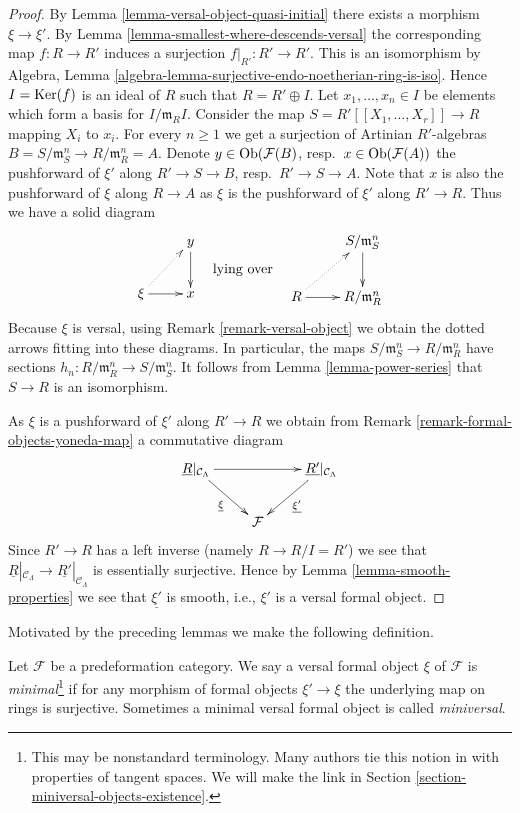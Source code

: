 \begin{proof}
By
Lemma \ref{lemma-versal-object-quasi-initial}
there exists a morphism $\xi \to \xi'$. By
Lemma \ref{lemma-smallest-where-descends-versal}
the corresponding map $f : R \to R'$ induces a surjection
$f|_{R'} : R' \to R'$. This is an isomorphism by
Algebra, Lemma \ref{algebra-lemma-surjective-endo-noetherian-ring-is-iso}.
Hence $I = \mathop{\mathrm{Ker}}(f)$ is an ideal of $R$ such that $R = R' \oplus I$.
Let $x_1, \ldots, x_n \in I$ be elements which form a basis for
$I/\mathfrak m_RI$. Consider the map
$S = R'[[X_1, \ldots, X_r]] \to R$ mapping $X_i$ to $x_i$.
For every $n \geq 1$ we get a surjection of Artinian $R'$-algebras
$B = S/\mathfrak m_S^n \to R/\mathfrak m_R^n = A$. Denote
$y \in \mathop{\mathrm{Ob}}\nolimits(\mathcal{F}(B)$, resp.\ $x \in \mathop{\mathrm{Ob}}\nolimits(\mathcal{F}(A))$
the pushforward of $\xi'$ along $R' \to S \to B$, resp.\ $R' \to S \to A$.
Note that $x$ is also the pushforward of $\xi$ along $R \to A$ as
$\xi$ is the pushforward of $\xi'$ along $R' \to R$.
Thus we have a solid diagram
$$
\vcenter{
\xymatrix{
& y \ar[d] \\
\xi \ar[r] \ar@{..>}[ru] & x
}
}
\quad\text{lying over}\quad
\vcenter{
\xymatrix{
& S/\mathfrak m_S^n \ar[d] \\
R \ar[r] \ar@{..>}[ru] & R/\mathfrak m_R^n
}
}
$$
Because $\xi$ is versal, using
Remark \ref{remark-versal-object}
we obtain the dotted arrows fitting into these diagrams.
In particular, the maps $S/\mathfrak m_S^n \to R/\mathfrak m_R^n$
have sections $h_n : R/\mathfrak m_R^n \to S/\mathfrak m_S^n$.
It follows from
Lemma \ref{lemma-power-series}
that $S \to R$ is an isomorphism.

\medskip\noindent
As $\xi$ is a pushforward of $\xi'$ along $R' \to R$ we obtain from
Remark \ref{remark-formal-objects-yoneda-map}
a commutative diagram
$$
\xymatrix{
\underline{R}|_{\mathcal{C}_\Lambda} \ar[rr] \ar[rd]_{\underline{\xi}} & &
\underline{R'}|_{\mathcal{C}_\Lambda} \ar[ld]^{\underline{\xi'}} \\
& \mathcal{F}
}
$$
Since $R' \to R$ has a left inverse (namely $R \to R/I = R'$) we see that
$\underline{R}|_{\mathcal{C}_\Lambda} \to
\underline{R'}|_{\mathcal{C}_\Lambda}$ is essentially surjective.
Hence by
Lemma \ref{lemma-smooth-properties}
we see that $\underline{\xi'}$ is smooth, i.e., $\xi'$ is a versal
formal object.
\end{proof}

\noindent
Motivated by the preceding lemmas we make the following definition.

\begin{definition}
\label{definition-minimal-versal}
Let $\mathcal{F}$ be a predeformation category.
We say a versal formal object $\xi$ of $\mathcal{F}$ is
{\it minimal}\footnote{This may be nonstandard terminology. Many
authors tie this notion in with properties of tangent spaces.
We will make the link in
Section \ref{section-miniversal-objects-existence}.}
if for any morphism of formal objects
$\xi' \to \xi$ the underlying map on rings is surjective.
Sometimes a minimal versal formal object is called {\it miniversal}.
\end{definition}

